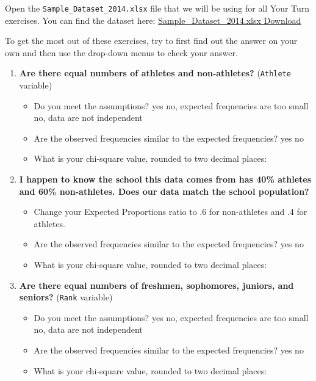 \documentclass[
]{book}
\begin{document}
Open the \texttt{Sample\_Dataset\_2014.xlsx} file that we will be using for all Your Turn exercises. You can find the dataset here: \href{https://github.com/danawanzer/stats-with-jamovi/blob/master/data/Sample_Dataset_2014.xlsx}{Sample\_Dataset\_2014.xlsx Download}

To get the most out of these exercises, try to first find out the answer on your own and then use the drop-down menus to check your answer.

\begin{enumerate}
\def\labelenumi{\arabic{enumi}.}
\item
  \textbf{Are there equal numbers of athletes and non-athletes?} (\texttt{Athlete} variable)

  \begin{itemize}
  \item
    Do you meet the assumptions? yes no, expected frequencies are too small no, data are not independent
  \item
    Are the observed frequencies similar to the expected frequencies? yes no
  \item
    What is your chi-square value, rounded to two decimal places:
  \end{itemize}
\item
  \textbf{I happen to know the school this data comes from has 40\% athletes and 60\% non-athletes. Does our data match the school population?}

  \begin{itemize}
  \item
    Change your Expected Proportions ratio to .6 for non-athletes and .4 for athletes.
  \item
    Are the observed frequencies similar to the expected frequencies? yes no
  \item
    What is your chi-square value, rounded to two decimal places:
  \end{itemize}
\item
  \textbf{Are there equal numbers of freshmen, sophomores, juniors, and seniors?} (\texttt{Rank} variable)

  \begin{itemize}
  \item
    Do you meet the assumptions? yes no, expected frequencies are too small no, data are not independent
  \item
    Are the observed frequencies similar to the expected frequencies? yes no
  \item
    What is your chi-square value, rounded to two decimal places:
  \end{itemize}
\end{enumerate}
\end{document}
